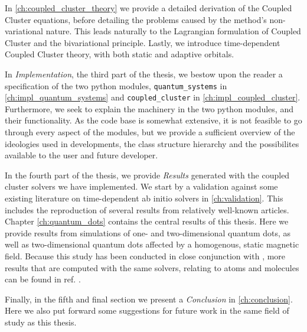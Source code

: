     In \autoref{ch:coupled_cluster_theory}
    we provide a detailed derivation
    of the Coupled Cluster equations, before detailing the problems caused 
    by the method's non-variational nature. This leads naturally to 
    the Lagrangian formulation of Coupled Cluster\cite{helgaker1988analytical}
    and the bivariational principle\cite{arponen1983variational}. Lastly,
    we introduce time-dependent Coupled Cluster theory, with both static and 
    adaptive orbitals\cite{kvaal2012ab}.

    In \emph{Implementation}, the third part of the thesis, we bestow upon the reader 
    a specification of the two python modules, \lstinline{quantum_systems} in 
    \autoref{ch:impl_quantum_systems}
    and \lstinline{coupled_cluster} in \autoref{ch:impl_coupled_cluster}.
    Furthermore, we seek to explain the machinery
    in the two python modules, and their functionality. As the code base is somewhat 
    extensive, it is not feasible to go through every aspect of the modules, but we 
    provide a sufficient overview of the ideologies used in developments, the class
    structure hierarchy and the possibilites available to the user and future developer.

    In the fourth part of the thesis, we provide \emph{Results} generated with the
    coupled cluster solvers we have implemented. We start by a validation against
    some existing literature on time-dependent ab initio solvers in \autoref{ch:validation}.
    This includes 
    the reproduction of several results from relatively well-known articles. 
    Chapter \ref{ch:quantum_dots} contains the central results of 
    this thesis. Here we provide results from simulations of one- and two-dimensional 
    quantum dots, as well as two-dimensional quantum 
    dots affected by a homogenous, static magnetic field. Because this study 
    has been conducted in close conjunction with
    \citeauthor{islandwind2019}, more results that are computed with the 
    same solvers, relating to atoms and molecules can be found in ref.
    \cite{islandwind2019}.
   
    Finally, in the fifth and final section we present a \emph{Conclusion} 
    in \autoref{ch:conclusion}. Here we also put forward
    some suggestions for future work in the same field of study as this thesis.
